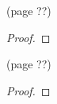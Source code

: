 \documentclass{article}
\newenvironment{problem}[2][Problem]{\begin{trivlist}
\item[\hskip \labelsep {\bfseries #1}\hskip \labelsep {\bfseries #2.}]}{\end{trivlist}}
\begin{document}
\pagebreak

\begin{problem}{?} (page ??) \\
\end{problem}

\begin{proof}
\end{proof}
\pagebreak

\begin{problem}{?} (page ??) \\
\end{problem}

\begin{proof}
\end{proof}
\end{document}
